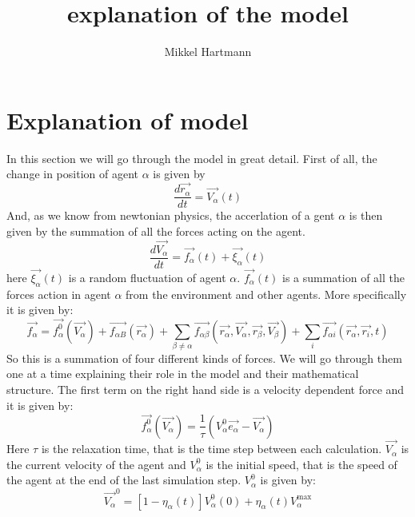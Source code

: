 \documentclass[12pt,a4paper]{report} %
\author{Mikkel Hartmann}
\title{explanation of the model}
\begin{document}
 
\section{Explanation of model}
In this section we will go through the model in great detail. First of all, the change in position of agent $\alpha$ is given by
	\begin{equation}
		\frac{d \vec{r_{\alpha}}}{dt} = \vec{V_{\alpha}} \left( t \right)
	\end{equation}
And, as we know from newtonian physics, the accerlation of a gent $\alpha$ is then given by the summation of all the forces acting on the agent.
\begin{equation}
	\frac{d \vec{V_{\alpha}}}{dt} = \vec{f_{\alpha}} \left( t \right) + \vec{\xi_{\alpha}}\left( t \right)
\end{equation}
here $\vec{\xi_{\alpha}} \left( t \right)$ is a random fluctuation of agent $\alpha$. $\vec{f_{\alpha}} \left( t \right)$ is a summation of all the forces action in agent $\alpha$ from the environment and other agents. More specifically it is given by:
\begin{equation}\label{model}
	\vec{f_{\alpha}} = \vec{f^{0}_{\alpha}}\left( \vec{V_{\alpha}} \right) + \vec{f_{\alpha B}} \left( \vec{r_{\alpha}} \right) + \sum_{\beta \neq \alpha} \vec{f_{\alpha \beta}} \left(\vec{r_{\alpha}}, \vec{V_{\alpha}}, \vec{r_{\beta}}, \vec{V_{\beta}} \right) + \sum_{i} \vec{f_{\alpha i}} \left( \vec{r_{\alpha}}, \vec{r_{i}}, t \right)
\end{equation}
So this is a summation of four different kinds of forces. We will go through them one at a time explaining their role in the model and their mathematical structure. The first term on the right hand side is a velocity dependent force and it is given by:
\begin{equation}
	\vec{f^{0}_{\alpha}}\left( \vec{V_{\alpha}} \right) = \frac{1}{\tau} \left( V_{\alpha}^{0} \vec{e_{\alpha}} - \vec{V_{\alpha}} \right)
\end{equation}
Here $\tau$ is the relaxation time, that is the time step between each calculation. $\vec{V_{\alpha}}$ is the current velocity of the agent and $V_{\alpha}^{0}$ is the initial speed, that is the speed of the agent at the end of the last simulation step. $V_{\alpha}^{0}$ is given by:
\begin{equation}
	\vec{V_{\alpha}}^{0} = \left[ 1 - \eta_{\alpha} \left( t \right) \right] V_{\alpha}^{0} \left( 0 \right) + \eta_{\alpha} \left( t \right)V_{\alpha}^{\text{max}}
\end{equation}
\end{document}
